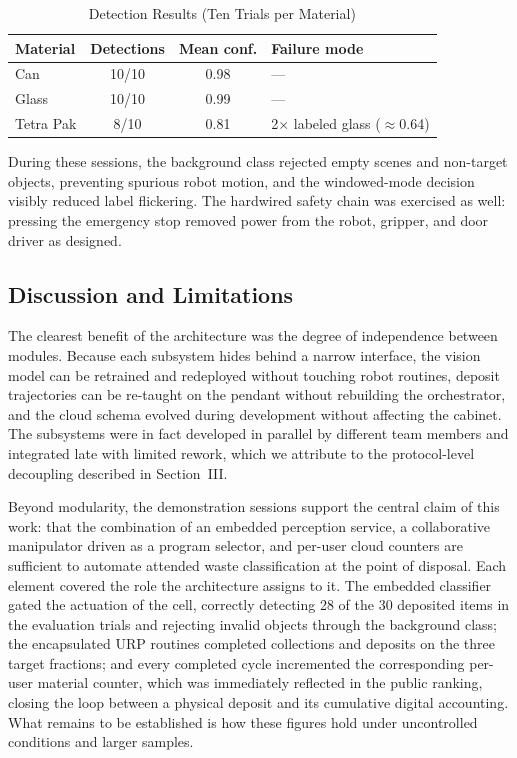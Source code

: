 ﻿\documentclass[conference]{IEEEtran}
\begin{document}
\begin{table}[!t]
\caption{Detection Results (Ten Trials per Material)}
\begin{center}
\footnotesize
\begin{tabular}{|l|c|c|l|}
\hline
\textbf{Material} & \textbf{Detections} & \textbf{Mean conf.} & \textbf{Failure mode} \\
\hline
Can & 10/10 & 0.98 & --- \\
\hline
Glass & 10/10 & 0.99 & --- \\
\hline
Tetra Pak & 8/10 & 0.81 & 2$\times$ labeled glass ($\approx$0.64) \\
\hline
\end{tabular}
\label{tab:results}
\end{center}
\end{table}

During these sessions, the background class rejected empty scenes and non-target objects, preventing spurious robot motion, and the windowed-mode decision visibly reduced label flickering. The hardwired safety chain was exercised as well: pressing the emergency stop removed power from the robot, gripper, and door driver as designed.

\subsection{Discussion and Limitations}
The clearest benefit of the architecture was the degree of independence between modules. Because each subsystem hides behind a narrow interface, the vision model can be retrained and redeployed without touching robot routines, deposit trajectories can be re-taught on the pendant without rebuilding the orchestrator, and the cloud schema evolved during development without affecting the cabinet. The subsystems were in fact developed in parallel by different team members and integrated late with limited rework, which we attribute to the protocol-level decoupling described in Section~III.

Beyond modularity, the demonstration sessions support the central claim of this work: that the combination of an embedded perception service, a collaborative manipulator driven as a program selector, and per-user cloud counters are sufficient to automate attended waste classification at the point of disposal. Each element covered the role the architecture assigns to it. The embedded classifier gated the actuation of the cell, correctly detecting 28 of the 30 deposited items in the evaluation trials and rejecting invalid objects through the background class; the encapsulated URP routines completed collections and deposits on the three target fractions; and every completed cycle incremented the corresponding per-user material counter, which was immediately reflected in the public ranking, closing the loop between a physical deposit and its cumulative digital accounting. What remains to be established is how these figures hold under uncontrolled conditions and larger samples.
\end{document}
